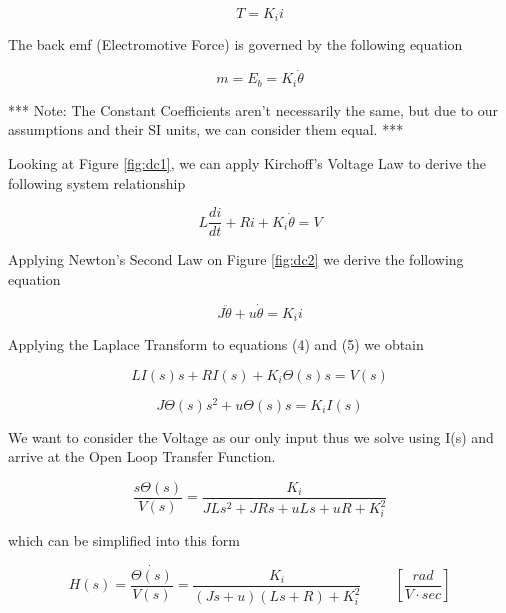 \begin{equation}
T = K_{i} i
\end{equation}


\noindent The back emf (Electromotive Force) is governed by the following equation

\begin{equation}
m = E_b = K_{i} \dot{\theta}
\end{equation}

*** Note: The Constant Coefficients aren't necessarily the same, but due to our assumptions and their SI units, we can consider them equal. ***
\break

\noindent Looking at Figure \ref{fig:dc1}, we can apply Kirchoff's Voltage Law to derive the following system relationship

\begin{equation}
L \frac{di}{dt} + Ri + K_{i} \dot{\theta} = V
\end{equation}

\noindent Applying Newton's Second Law on Figure \ref{fig:dc2} we derive the following equation

\begin{equation}
J \ddot{\theta} + u \dot{\theta} = K_{i} i
\end{equation}

Applying the Laplace Transform to equations (4) and (5) we obtain

\begin{equation}
LI(s)s + RI(s) + K_{i} \Theta(s)s = V(s)
\end{equation}

\begin{equation}
J \Theta (s) s^{2} + u \Theta (s) s = K_{i}I(s)
\end{equation}

We want to consider the Voltage as our only input thus we solve using I(s) and arrive at the Open Loop Transfer Function. 

\begin{equation}
\frac{s \Theta(s)}{V(s)}  = \frac{K_{i}}{JLs^{2} + JRs +uLs + uR + K_{i}^{2}}
\end{equation}

\noindent which can be simplified into this form

\begin{equation}
H(s) = \frac{\dot{\Theta(s)}}{V(s)}  = \frac{K_{i}}{(Js+u)(Ls+R) + K_{i}^{2}}  \hspace{1cm} [\frac{rad}{V \cdot sec}]
\end{equation}

